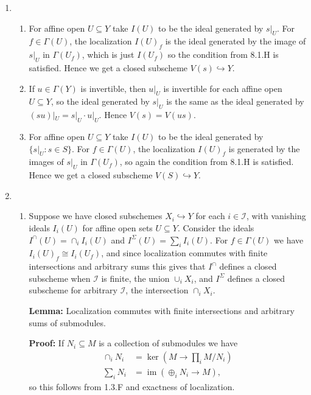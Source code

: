 \documentclass{report}
\newcommand{\tsum}{{\textstyle\sum}} %
\newcommand{\tprod}{{\textstyle\prod}} %
\newcommand{\I}{\mathscr{I}}
\DeclareMathOperator{\im}{im}
\begin{document}
\begin{enumerate}[label=\textbf{8.1.\Alph*.}]
	\item
	      \begin{enumerate}[label=(\alph*)]
		      \item For affine open $U\subseteq Y$ take $I(U)$ to be the ideal
		            generated by $s|_U$. For $f\in\Gamma(U)$, the localization
		            $I(U)_f$ is the ideal generated by the image of $s|_U$ in
		            $\Gamma(U_f)$, which is just $I(U_f)$ so the condition from
		            8.1.H is satisfied. Hence we get a closed subscheme
		            $V(s)\hookrightarrow Y$.

		      \item If $u\in\Gamma(Y)$ is invertible, then $u|_U$ is invertible
		            for each affine open $U\subseteq Y$, so the ideal generated by
		            $s|_U$ is the same as the ideal generated by
		            $(su)|_U=s|_U\cdot u|_U$. Hence $V(s)=V(us)$.

		      \item For affine open $U\subseteq Y$ take $I(U)$ to be the ideal
		            generated by $\{s|_U:s\in S\}$. For $f\in\Gamma(U)$, the
		            localization $I(U)_f$ is generated by the images of $s|_U$ in
		            $\Gamma(U_f)$, so again the condition from 8.1.H is satisfied.
		            Hence we get a closed subscheme $V(S)\hookrightarrow Y$.
	      \end{enumerate}

	\item
	      \begin{enumerate}[label=(\alph*)]
		      \item Suppose we have closed subschemes $X_i\hookrightarrow Y$ for
		            each $i\in\I$, with vanishing ideals $I_i(U)$ for affine open
		            sets $U\subseteq Y$. Consider the ideals
		            $I^\cap(U)=\cap_iI_i(U)$ and $I^\Sigma(U)=\sum_iI_i(U)$. For
		            $f\in\Gamma(U)$ we have $I_i(U)_f\cong I_i(U_f)$, and since
		            localization commutes with finite intersections and arbitrary
		            sums this gives that $I^\cap$ defines a closed subscheme when
		            $\I$ is finite, the union $\cup_iX_i$, and $I^\Sigma$ defines a
		            closed subscheme for arbitrary $\I$, the intersection
		            $\cap_iX_i$.

		            \textbf{Lemma:} Localization commutes with finite intersections
		            and arbitrary sums of submodules.

		            \textbf{Proof:} If $N_i\subseteq M$ is a collection of
		            submodules we have
		            \begin{align*}
			            \cap_iN_i  & = \ker(M\to\tprod_iM/N_i) \\
			            \tsum_iN_i & = \im(\oplus_iN_i\to M),
		            \end{align*}
		            so this follows from 1.3.F and exactness of localization.


\end{enumerate}
\end{enumerate}
\end{document}
